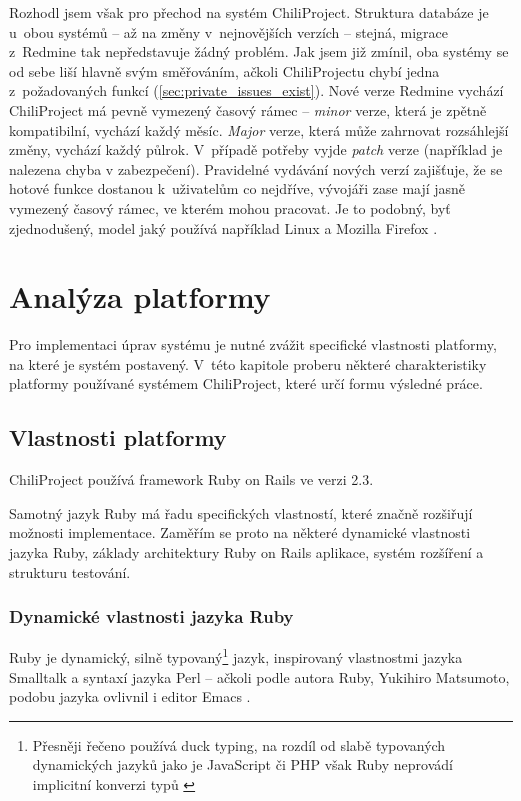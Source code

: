 \documentclass[thesis=B,czech]{FITthesis}[2012/05/02]
\begin{document}
Rozhodl jsem však pro přechod na systém ChiliProject. Struktura databáze
je u~obou systémů -- až na změny v~nejnovějších verzích -- stejná,
migrace z~Redmine tak nepředstavuje žádný problém. Jak jsem již zmínil,
oba systémy se od sebe liší hlavně svým směřováním, ačkoli
ChiliProjectu chybí jedna z~požadovaných funkcí
(\autoref{sec:private_issues_exist}). Nové verze Redmine vychází
 ChiliProject má pevně vymezený časový rámec
-- \emph{minor} verze, která je zpětně kompatibilní,
vychází každý měsíc. \emph{Major} verze, která může zahrnovat rozsáhlejší změny,
vychází každý půlrok. V~případě potřeby vyjde \emph{patch} verze (například je nalezena chyba v zabezpečení).
Pravidelné vydávání nových verzí zajišťuje, že se hotové funkce dostanou
k~uživatelům co nejdříve, vývojáři zase mají jasně vymezený časový
rámec, ve kterém mohou pracovat. Je to podobný, byť zjednodušený, model
jaký používá například Linux a Mozilla Firefox
\citep{MozillaDevProcess}.

\chapter{Analýza platformy}
\label{chap:analyza_navrh}

Pro implementaci úprav systému je nutné zvážit specifické vlastnosti
platformy, na které je systém postavený. V~této kapitole proberu některé
charakteristiky platformy používané systémem ChiliProject, které určí
formu výsledné práce.

\section{Vlastnosti platformy}

ChiliProject používá framework Ruby on Rails ve verzi 2.3.

Samotný jazyk Ruby má řadu specifických vlastností, které značně
rozšiřují možnosti implementace. Zaměřím se proto na některé dynamické
vlastnosti jazyka Ruby, základy architektury Ruby on Rails aplikace,
systém rozšíření a strukturu testování.

\subsection{Dynamické vlastnosti jazyka Ruby}
\label{sec:vlastnosti-ruby}

Ruby je dynamický, silně typovaný\footnote{Přesněji řečeno používá
  \gls{duck typing}, na rozdíl od slabě typovaných dynamických jazyků
  jako je JavaScript či PHP však Ruby neprovádí implicitní konverzi typů
  \citep{Lamontagne2007}} jazyk, inspirovaný vlastnostmi jazyka
Smalltalk a syntaxí jazyka Perl \citep{Stewart2001} -- ačkoli podle
autora Ruby, Yukihiro  Matsumoto, podobu jazyka ovlivnil i editor
Emacs \citep{Matsumoto2012}.
\end{document}

